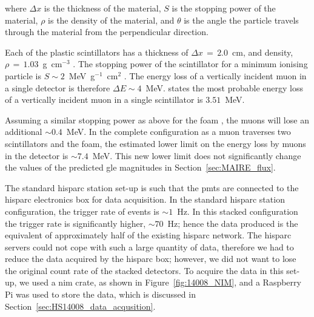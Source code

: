 where $\Delta x$ is the thickness of the material, $S$ is the stopping power of the material, $\rho$ is the density of the material, and $\theta$ is the angle the particle travels through the material from the perpendicular direction.

Each of the plastic scintillators has a thickness of $\Delta x \, = \, 2.0$~cm, and density, $\rho \, = \, 1.03$~g~cm$^{-3}$ \citep{montanus_observability_2017}. The stopping power of the scintillator for a minimum ionising particle is $S \sim 2$~MeV~g$^{-1}$~cm$^{2}$ \citep{fokkema_hisparc_2012, montanus_observability_2017}. The energy loss of a vertically incident muon in a single detector is therefore $\Delta E \sim 4$~MeV. \cite{van_dam_hisparc_2020} states the most probable energy loss of a vertically incident muon in a single scintillator is $3.51$~MeV.

Assuming a similar stopping power as above for the foam \citep{groom_muon_2001, montanus_observability_2017}, the muons will lose an additional $\sim 0.4$~MeV. In the complete configuration as a muon traverses two scintillators and the foam, the estimated lower limit on the energy loss by muons in the detector is $\sim 7.4$~MeV. This new lower limit does not significantly change the values of the predicted \gls{gle} magnitudes in Section~\ref{sec:MAIRE_flux}.

The standard \gls{hisparc} station set-up is such that the \glspl{pmt} are connected to the \gls{hisparc} electronics box for data acquisition. In the standard \gls{hisparc} station configuration, the trigger rate of events is $\sim 1$~Hz. In this stacked configuration the trigger rate is significantly higher, $\sim 70$~Hz; hence the data produced is the equivalent of approximately half of the existing \gls{hisparc} network. The \gls{hisparc} servers could not cope with such a large quantity of data, therefore we had to reduce the data acquired by the \gls{hisparc} box; however, we did not want to lose the original count rate of the stacked detectors. To acquire the data in this set-up, we used a \gls{nim} crate, as shown in Figure~\ref{fig:14008_NIM}, and a Raspberry Pi was used to store the data, which is discussed in Section~\ref{sec:HS14008_data_acqusition}.

